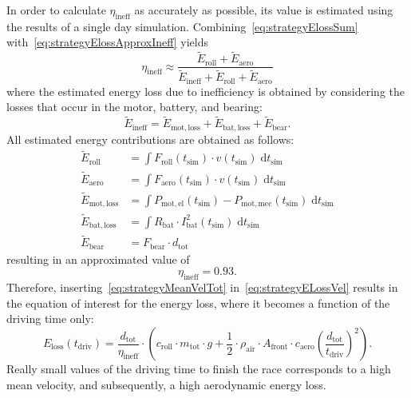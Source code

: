 In order to calculate $\eta_\mathrm{ineff}$ as accurately as possible, its value is estimated using the results of a single day simulation. Combining~\cref{eq:strategyElossSum} with~\cref{eq:strategyElossApproxIneff} yields
\begin{equation}
	\eta_\mathrm{ineff} \approx \frac{\tilde{E}_\mathrm{roll} + \tilde{E}_\mathrm{aero}}{\tilde{E}_\mathrm{ineff} + \tilde{E}_\mathrm{roll} + \tilde{E}_\mathrm{aero}} \label{eq:strategyInefficiency}
\end{equation}
where the estimated energy loss due to inefficiency is obtained by considering the losses that occur in the motor, battery, and bearing:
\begin{equation}
	\tilde{E}_\mathrm{ineff} = \tilde{E}_\mathrm{mot,loss} + \tilde{E}_\mathrm{bat,loss} + \tilde{E}_\mathrm{bear}.
\end{equation}
All estimated energy contributions are obtained as follows:
\begin{align}
	\tilde{E}_\mathrm{roll} &= \int F_\mathrm{roll}(t_\mathrm{sim}) \cdot v(t_\mathrm{sim}) \;\mathrm{d}t_\mathrm{sim} \\
	\tilde{E}_\mathrm{aero} &= \int F_\mathrm{aero}(t_\mathrm{sim}) \cdot v(t_\mathrm{sim}) \;\mathrm{d}t_\mathrm{sim} \\
	\tilde{E}_\mathrm{mot,loss} &= \int P_\mathrm{mot,el}(t_\mathrm{sim}) - P_\mathrm{mot,mec}(t_\mathrm{sim}) \;\mathrm{d}t_\mathrm{sim} \\
	\tilde{E}_\mathrm{bat,loss} &= \int R_\mathrm{bat} \cdot I_\mathrm{bat}^2(t_\mathrm{sim}) \;\mathrm{d}t_\mathrm{sim} \\
	\tilde{E}_\mathrm{bear} &= F_\mathrm{bear} \cdot d_\mathrm{tot} \label{eq:strategyBearForce}
\end{align}
resulting in an approximated value of
\begin{equation}
	\eta_\mathrm{ineff} = 0.93.
\end{equation}
Therefore, inserting~\cref{eq:strategyMeanVelTot} in~\cref{eq:strategyELossVel} results in the equation of interest for the energy loss, where it becomes a function of the driving time only:
\begin{equation}
	E_\mathrm{loss}(t_\mathrm{driv}) = \frac{d_\mathrm{tot}}{\eta_\mathrm{ineff}} \cdot \left(c_\mathrm{roll} \cdot m_\mathrm{tot} \cdot g + \frac{1}{2} \cdot \rho_\mathrm{air} \cdot A_\mathrm{front} \cdot c_\mathrm{aero} \left(\frac{d_\mathrm{tot}}{t_\mathrm{driv}}\right)^2\right). \label{eq:strategyELossTime}
\end{equation}
Really small values of the driving time to finish the race corresponds to a high mean velocity, and subsequently, a high aerodynamic energy loss.

